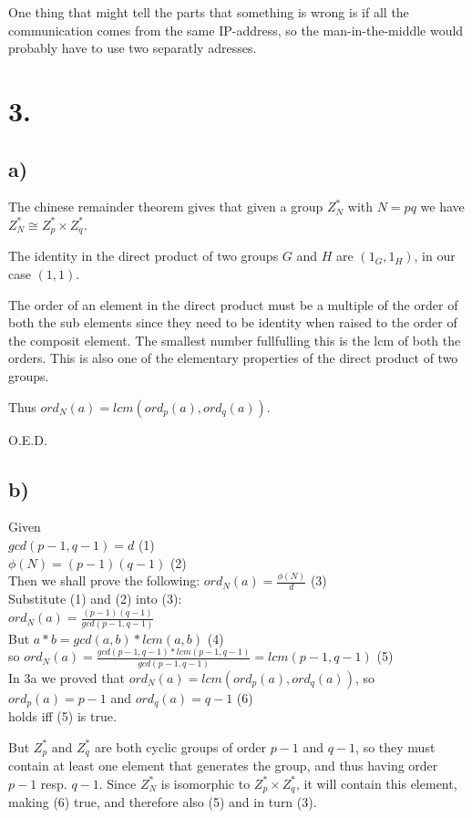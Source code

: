 \documentclass[a4paper,11pt]{article}
\begin{document}
	One thing that might tell the parts that something is wrong is if all the communication 
	comes from the same IP-address, so the man-in-the-middle would probably have to use two
	separatly adresses.


	\section*{3. }
	\subsection*{a) }
	
	The chinese remainder theorem gives that given a group $Z^*_N$ with $N=pq$ we have
	$Z^*_N \cong Z^*_p \times Z^*_q$.

	The identity in the direct product of two groups $G$ and $H$ are $(1_G, 1_H)$, in our
	case $(1, 1)$.

	The order of an element in the direct product must be a multiple of
	the order of both the sub elements since they need to be identity when raised to the
	order of the composit element. The smallest number fullfulling this is the lcm of
	both the orders.
	This is also one of the elementary properties of the direct product of two groups.

	Thus $ ord_N(a) = lcm(ord_p(a), ord_q(a)) $.

	O.E.D.

	\subsection*{b) }
	Given\\
	$gcd(p-1, q-1) = d$ (1)\\
	$\phi(N) = (p-1)(q-1)$ (2)\\
	Then we shall prove the following:
	$ord_N(a) = \frac{\phi(N)}{d}$ (3)\\
	Substitute (1) and (2) into (3):\\
	$ ord_N(a) = \frac{(p-1)(q-1)}{gcd(p-1, q-1)} $\\ 
	But $ a*b = gcd(a, b) * lcm(a, b)$ (4) \\
	so $ ord_N(a) = \frac{gcd(p-1, q-1)*lcm(p-1, q-1)}{gcd(p-1, q-1)} = lcm(p-1, q-1)$ (5)\\
	
	In 3a we proved that $ ord_N(a) = lcm(ord_p(a), ord_q(a)) $, so
	$ord_p(a) = p-1 $ and $ord_q(a) = q-1$ (6) \\
	holds iff (5) is true.

	But $Z^*_p$ and $Z^*_q$ are both cyclic groups of order $p-1$ and $q-1$,
	so they must contain at least one element that generates the group, 
	and thus having order $p-1$ resp. $q-1$. Since $Z^*_N$ is isomorphic to $Z^*_p \times Z^*_q$,
	it will contain this element, making (6) true, and therefore also (5) and in turn (3).
\end{document}
